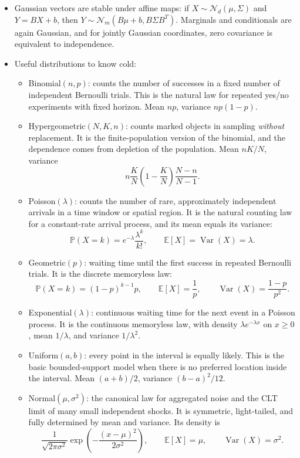 \documentclass[11pt]{article}
\theoremstyle{definition}
\newcommand{\E}{\mathbb{E}}
\newcommand{\Var}{\operatorname{Var}}
\begin{document}
\begin{itemize}
    \item Gaussian vectors are stable under affine maps: if $X\sim \mathcal{N}_d(\mu,\Sigma)$ and $Y=BX+b$, then $Y\sim \mathcal{N}_m(B\mu+b,B\Sigma B^T)$. Marginals and conditionals are again Gaussian, and for jointly Gaussian coordinates, zero covariance is equivalent to independence.
    \item Useful distributions to know cold:
    \begin{itemize}
        \item Binomial$(n,p)$: counts the number of successes in a fixed number of independent Bernoulli trials. This is the natural law for repeated yes/no experiments with fixed horizon. Mean $np$, variance $np(1-p)$.
        \item Hypergeometric$(N,K,n)$: counts marked objects in sampling \emph{without} replacement. It is the finite-population version of the binomial, and the dependence comes from depletion of the population. Mean $nK/N$, variance
        \[
            n\frac{K}{N}\left(1-\frac{K}{N}\right)\frac{N-n}{N-1}.
        \]
        \item Poisson$(\lambda)$: counts the number of rare, approximately independent arrivals in a time window or spatial region. It is the natural counting law for a constant-rate arrival process, and its mean equals its variance:
        \[
            \mathbb{P}(X=k)=e^{-\lambda}\frac{\lambda^k}{k!}, \qquad \E[X]=\Var(X)=\lambda.
        \]
        \item Geometric$(p)$: waiting time until the first success in repeated Bernoulli trials. It is the discrete memoryless law:
        \[
            \mathbb{P}(X=k)=(1-p)^{k-1}p, \qquad \E[X]=\frac{1}{p}, \qquad \Var(X)=\frac{1-p}{p^2}.
        \]
        \item Exponential$(\lambda)$: continuous waiting time for the next event in a Poisson process. It is the continuous memoryless law, with density $\lambda e^{-\lambda x}$ on $x\ge 0$, mean $1/\lambda$, and variance $1/\lambda^2$.
        \item Uniform$(a,b)$: every point in the interval is equally likely. This is the basic bounded-support model when there is no preferred location inside the interval. Mean $(a+b)/2$, variance $(b-a)^2/12$.
        \item Normal$(\mu,\sigma^2)$: the canonical law for aggregated noise and the CLT limit of many small independent shocks. It is symmetric, light-tailed, and fully determined by mean and variance. Its density is
        \[
            \frac{1}{\sqrt{2\pi\sigma^2}}\exp\left(-\frac{(x-\mu)^2}{2\sigma^2}\right), \qquad \E[X]=\mu, \qquad \Var(X)=\sigma^2.
\]
\end{itemize}
\end{itemize}
\end{document}
